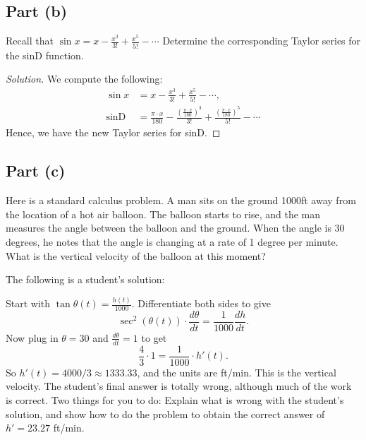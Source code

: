 \documentclass[letterpaper, 12pt]{amsart}
\theoremstyle{definition}  %
\begin{document}
		\subsection*{Part (b)}
		Recall that $\sin x = x - \frac{x^{3}}{3!} + \frac{x^{5}}{5!} - \cdots$
		Determine the corresponding Taylor series for the sinD function.

		\begin{proof}[Solution]
		We compute the following:
			\begin{align*}
				\sin x &= x - \frac{x^{3}}{3!} + \frac{x^{5}}{5!} - \cdots, \\
				\text{sinD} &= \frac{\pi \cdot x}{180} - \frac{\left( \frac{\pi \cdot x}{180} \right)^{3}}{3!} + \frac{\left( \frac{\pi \cdot x}{180} \right)^{5}}{5!} - \cdots 
			\end{align*}
		Hence, we have the new Taylor series for sinD.
		\end{proof}

		\subsection*{Part (c)}
		Here is a standard calculus problem. 
		A man sits on the ground 1000ft away from the location of a hot air balloon. 
		The balloon starts to rise, and the man measures the angle between the balloon and the ground. 
		When the angle is 30 degrees, he notes that the angle is changing at a rate of 1 degree per minute. 
		What is the vertical velocity of the balloon at this moment?

		The following is a student’s solution:

		Start with $\tan \theta(t) = \frac{h(t)}{1000}$. 
		Differentiate both sides to give $$\sec^{2}( \theta(t)) \cdot \frac{d \theta}{dt} = \frac{1}{1000}\frac{dh}{dt}.$$
		Now plug in $\theta = 30$ and $\frac{d \theta}{dt} = 1$ to get $$\frac{4}{3} \cdot 1 = \frac{1}{1000} \cdot h'(t).$$
		So $h'(t) = 4000/3 \approx 1333.33$, and the units are ft/min. 
		This is the vertical velocity.
		The student’s final answer is totally wrong, although much of the work is correct. 
		Two things for you to do: 
		Explain what is wrong with the student’s solution, and show how to do the problem to obtain the correct answer of $h' = 23.27$ ft/min.
\end{document}
